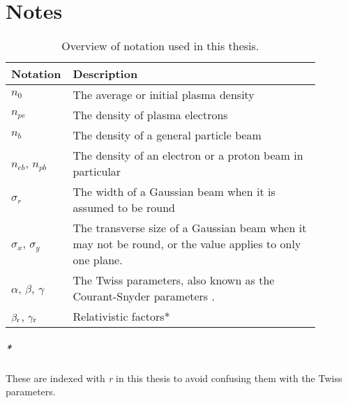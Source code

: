 \chapter*{Notes}

\begin{table}[hbt]
    \centering
    \caption{Overview of notation used in this thesis.}
    \label{T:Notes}
    \begin{tabular}{p{0.10\linewidth}|p{0.78\linewidth}}
        Notation  & Description \\
        \hline
        \hline
        $n_{0}$                     & The average or initial plasma density \\
        $n_{pe}$                    & The density of plasma electrons \\
        $n_{b}$                     & The density of a general particle beam \\
        $n_{eb}$, $n_{pb}$          & The density of an electron or a proton beam in particular \\
        \hline
        $\sigma_{r}$                & The width of a Gaussian beam when it is assumed to be round \\
        $\sigma_{x}$, $\sigma_{y}$  & The transverse size of a Gaussian beam when it may not be
                                      round, or the value applies to only one plane. \\
        \hline
        $\alpha$, $\beta$, $\gamma$ & The Twiss parameters, also known as the Courant-Snyder
                                      parameters \cite{courant:1958}. \\
        $\beta_{\mathrm{r}}$, $\gamma_{\mathrm{r}}$         & Relativistic factors* \\
    \end{tabular}
\end{table}

\paragraph{*}
These are indexed with \emph{r} in this thesis to avoid confusing them with the Twiss parameters.

\vfill